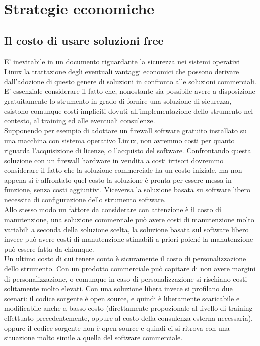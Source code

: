 \chapter{Strategie economiche}
\section{Il costo di usare soluzioni free}
E' inevitabile in un documento riguardante la sicurezza nei sistemi operativi Linux la trattazione degli eventuali vantaggi economici che possono derivare dall'adozione di questo genere di soluzioni in confronto alle soluzioni commerciali.\\
E' essenziale considerare il fatto che, nonostante sia possibile avere a disposizione gratuitamente lo strumento in grado di fornire una soluzione di sicurezza, esistono comunque costi impliciti dovuti all'implementazione dello strumento nel contesto, al training ed alle eventuali consulenze. \\
Supponendo per esempio di adottare un firewall software gratuito installato su una macchina con sistema operativo Linux, non avremmo costi per quanto riguarda l'acquisizione di licenze, o l'acquisto del software. Confrontando questa soluzione con un firewall hardware in vendita a costi irrisori dovremmo considerare il fatto che la soluzione commerciale ha un costo iniziale, ma non appena si è affrontato quel costo la soluzione è pronta per essere messa in funzione, senza costi aggiuntivi. Viceversa la soluzione basata su software libero necessita di configurazione dello strumento software.\\
Allo stesso modo un fattore da considerare con attenzione è il costo di manutenzione, una soluzione commerciale può avere costi di manutenzione molto variabili a seconda della soluzione scelta, la soluzione basata sul software libero invece può avere costi di manutenzione stimabili a priori poiché la manutenzione può essere fatta da chiunque.\\
Un ultimo costo di cui tenere conto è sicuramente il costo di personalizzazione dello strumento. Con un prodotto commerciale può capitare di non avere margini di personalizzazione, o comunque in caso di personalizzazione si rischiano costi solitamente molto elevati. Con una soluzione libera invece si profilano due scenari: il codice sorgente è open source, e quindi è liberamente scaricabile e modificabile anche a basso costo (direttamente propozionale al livello di training effettuato precedentemente, oppure al costo della consulenza esterna necessaria), oppure il codice sorgente non è open source e quindi ci si ritrova con una situazione molto simile a quella del software commerciale. \\

